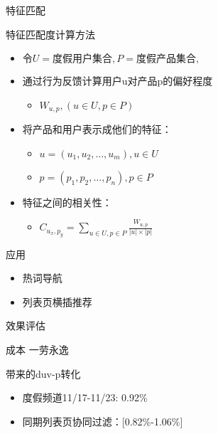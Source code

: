 \documentclass{beamer}
\begin{document}
\begin{CJK}{UTF8}{gbsn}
\begin{frame}{特征匹配}
\end{frame}

\begin{frame}{特征匹配度计算方法}
  \begin{itemize}
    \item { $ \text{令}U=\text{度假用户集合}, P=\text{度假产品集合}, $ }
    \item {
      通过行为反馈计算用户u对产品p的偏好程度
      \begin{itemize}
        \item {
          $ W_{u,p}, (u \in U, p \in P) $
        }
      \end{itemize}
    }
    \item {
      将产品和用户表示成他们的特征：
      \begin{itemize}
      \item { $ u=(u_1, u_2, \dots , u_m), u \in U $ }
      \item { $ p=(p_1, p_2, \dots , p_n), p \in P $ }
      \end{itemize}
    }
    \item {
      特征之间的相关性：
      \begin{itemize}
        \item { $ C_{u_x,p_y} = \sum_{u \in U, p \in P}{\frac{W_{u,p}}{|u| \times |p|}}$ }
      \end{itemize}
    } 
    
  \end{itemize}
\end{frame}


\begin{frame}{应用}
  \begin{itemize}
  \item {热词导航}
  \item {列表页横插推荐}
  \end{itemize}
\end{frame}

\begin{frame}{效果评估}
  \begin{block}{成本}
    一劳永逸
  \end{block}

  \begin{block}{带来的duv-p转化}
    \begin{itemize}
    \item {度假频道11/17-11/23: 0.92\%}
    \item {同期列表页协同过滤：[0.82\%-1.06\%]}
    \end{itemize}
  \end{block}

\end{frame}


\end{CJK}
\end{document}
